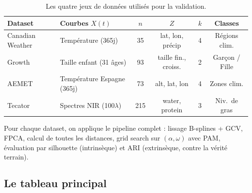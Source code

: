 \documentclass[11pt, a4paper]{article}
\begin{document}
\begin{table}[H]
\centering
\renewcommand{\arraystretch}{1.2}
\begin{tabular}{llcccc}
  \toprule
  \textbf{Dataset} & \textbf{Courbes $X(t)$} & $n$ & \textbf{$Z$} & $k$ & \textbf{Classes} \\
  \midrule
  Canadian Weather & Température (365j) & 35 & lat, lon, précip & 4 & Régions clim. \\
  Growth & Taille enfant (31 âges) & 93 & taille fin., croiss. & 2 & Garçon / Fille \\
  AEMET & Température Espagne (365j) & 73 & alt, lat, lon & 4 & Zones clim. \\
  Tecator & Spectres NIR (100$\lambda$) & 215 & water, protein & 3 & Niv.\ de gras \\
  \bottomrule
\end{tabular}
\caption{Les quatre jeux de données utilisés pour la validation.}
\end{table}

Pour chaque dataset, on applique le pipeline complet : lissage B-splines +
GCV, FPCA, calcul de toutes les distances, grid search sur $(\alpha, \omega)$
avec PAM, évaluation par silhouette (intrinsèque) et ARI (extrinsèque,
contre la vérité terrain).

\subsection{Le tableau principal}
\end{document}
